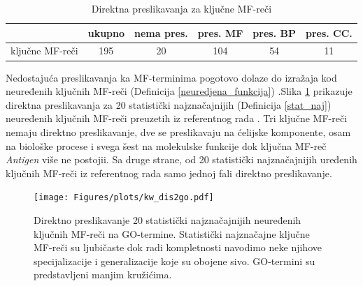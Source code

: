 \begin{table}[htpb]
\begin{tabular}{|r|c|c|c|c|c|}
  \hline
                   & ukupno & nema pres. & pres. MF & pres. BP & pres. CC.      \\
  \hline
   ključne MF-reči  & 195    &  20       &  104     & 54      & 11           \\
  \hline
\end{tabular}
  \centering
  \caption{Direktna preslikavanja za ključne MF-reči }
  \label{tab:direktna_map}
\end{table}

Nedostajuća preslikavanja ka MF-terminima pogotovo dolaze do izražaja kod
neuređenih ključnih MF-reči  (Definicija \ref{neuredjena_funkcija}) .Slika
\ref{fig:KWtop20dis} prikazuje direktna preslikavanja za 20 statistički
najznačajnijih (Definicija \ref{stat_naj}) neuređenih ključnih  MF-reči 
preuzetih iz referentnog rada \parencite{Xie2007}.  Tri ključne MF-reči  nemaju
direktno preslikavanje, dve se preslikavaju na ćelijske komponente, osam na
biološke procese i svega šest na molekulske funkcije dok ključna MF-reč 
\textit{Antigen} više ne postojii. Sa druge strane, od 20 statistički
najznačajnijih uređenih ključnih MF-reči  iz referentnog rada samo jednoj fali
direktno preslikavanje.

\begin{figure}[!th]
\centering
\hspace*{-1.5cm} 
\texttt{[image: Figures/plots/kw\_dis2go.pdf]}
\caption {
  Direktno preslikavanje 20 statistički najznačajnijih neuređenih ključnih MF-reči 
  \parencite{Xie2007} na GO-termine.  Statistički najznačajne ključne MF-reči  su
  ljubičaste dok radi kompletnosti navodimo neke njihove specijalizacije i
  generalizacije koje su obojene sivo. GO-termini su predstavljeni manjim
  kružićima.
}
\label{fig:KWtop20dis}
\end{figure}

